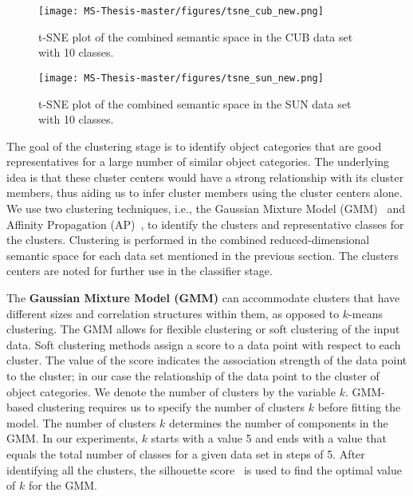 \begin{figure}[h!]
\texttt{[image: MS-Thesis-master/figures/tsne\_cub\_new.png]}
\caption{t-SNE plot of the combined semantic space in the CUB data set with 10 classes.}
\label{image:tsne_cub}
\end{figure}

\par
\medskip

\begin{figure}[h!]
\texttt{[image: MS-Thesis-master/figures/tsne\_sun\_new.png]}
\caption{t-SNE plot of the combined semantic space in the SUN data set with 10 classes.}
\label{image:tsne_sun}
\end{figure}

\par
\medskip


The goal of the clustering stage is to identify object categories that are good representatives for a large number of similar object categories. The underlying idea is that these cluster centers would have a strong relationship with its cluster members, thus aiding us to infer cluster members using the cluster centers alone. We use two clustering techniques, i.e., the Gaussian Mixture Model (GMM)~\cite{gmm} and Affinity Propagation (AP)~\cite{affinityprop}, to identify the clusters and representative classes for the clusters. Clustering is performed in the combined reduced-dimensional semantic space for each data set mentioned in the previous section. The clusters centers are noted for further use in the classifier stage.

\par
\medskip

The \textbf{Gaussian Mixture Model (GMM)} can accommodate clusters that have different sizes and correlation structures within them, as opposed to $k$-means clustering. The GMM allows for flexible clustering or soft clustering of the input data. Soft clustering methods assign a score to a data point with respect to each cluster. The value of the score indicates the association strength of the data point to the cluster; in our case the relationship of the data point to the cluster of object categories.  We denote the number of clusters by the variable $k$. GMM-based clustering requires us to specify the number of clusters $k$ before fitting the model. The number of clusters $k$ determines the number of components in the GMM. In our experiments, $k$ starts with a value 5 and ends with a value that equals the total number of classes for a given data set in steps of 5. After identifying all the clusters, the silhouette score~\cite{sil-score} is used to find the optimal value of $k$ for the GMM. 

